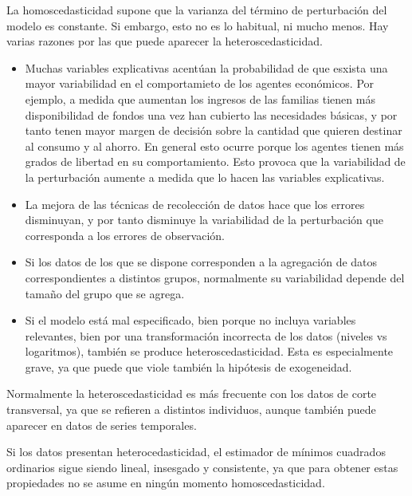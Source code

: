 

La homoscedasticidad supone que la varianza del t\'ermino de perturbaci\'on del modelo es constante. Si embargo, esto no es lo habitual, ni mucho menos. Hay varias razones por las que puede aparecer la heteroscedasticidad.

\begin{itemize}
\item Muchas variables explicativas acent\'uan la probabilidad de que esxista una mayor variabilidad en el comportamieto de los agentes econ\'omicos. Por ejemplo, a medida que aumentan los ingresos de las familias tienen m\'as disponibilidad de fondos una vez han cubierto las necesidades b\'asicas, y por tanto tenen mayor margen de decisi\'on sobre la cantidad que quieren destinar al consumo y al ahorro. En general esto ocurre porque los agentes tienen m\'as grados de libertad en su comportamiento. Esto provoca que la variabilidad de la perturbaci\'on aumente a medida que lo hacen las variables explicativas.
\item La mejora de las t\'ecnicas de recolecci\'on de datos hace que los errores disminuyan, y por tanto disminuye la variabilidad de la perturbaci\'on que corresponda a los errores de observaci\'on.
\item Si los datos de los que se dispone corresponden a la agregaci\'on de datos correspondientes a distintos grupos, normalmente su variabilidad depende del tama\~no del grupo que se agrega.
\item Si el modelo est\'a mal especificado, bien porque no incluya variables relevantes, bien por una transformaci\'on incorrecta de los datos (niveles vs logaritmos), tambi\'en se produce heteroscedasticidad. Esta es especialmente grave, ya que puede que viole tambi\'en la hip\'otesis de exogeneidad.
\end{itemize}

Normalmente la heteroscedasticidad es m\'as frecuente con los datos de corte transversal, ya que se refieren a distintos individuos, aunque tambi\'en puede aparecer en datos de series temporales.


Si los datos presentan heterocedasticidad, el estimador de m\'inimos cuadrados ordinarios sigue siendo lineal, insesgado y consistente, ya que para obtener estas propiedades no se asume en ning\'un momento homoscedasticidad.

